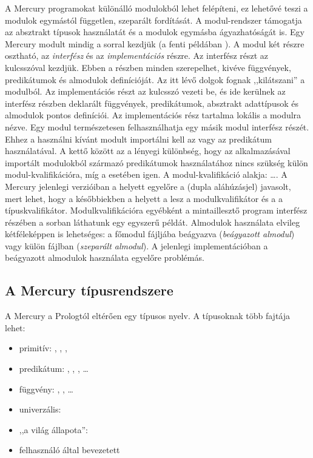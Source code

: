 A Mercury programokat különálló modulokból lehet felépíteni, ez lehetővé teszi a
modulok egymástól független, szeparált fordítását. A modul-rendszer támogatja az
absztrakt típusok használatát és a modulok egymásba ágyazhatóságát is.
\br
Egy Mercury modult mindig a   sorral kezdjük
(a fenti példában ). A modul két részre osztható, az
\emph{interfész} és az \emph{implementációs} részre. Az interfész részt az
 kulcsszóval kezdjük. Ebben a részben minden szerepelhet, kivéve
függvények, predikátumok és almodulok definícióját. Az itt lévő dolgok fognak
,,kilátszani'' a modulból. Az implementációs részt az  kulcsszó
vezeti be, és ide kerülnek az interfész részben deklarált függvények, predikátumok,
absztrakt adattípusok és almodulok pontos definíciói. Az implementációs rész tartalma
lokális a modulra nézve.
\br
Egy modul természetesen felhasználhatja egy másik modul interfész részét. Ehhez
a használni kívánt modult importálni kell az  
vagy az   predikátum használatával. A kettő
között az a lényegi különbség, hogy az  alkalmazásával importált
modulokból származó predikátumok használatához nincs szükség külön modul-kvalifikációra,
míg a  esetében igen. A modul-kvalifikáció alakja:
\cd{:}\cd{:}\dots\cd{:}\cd{:}.
A Mercury jelenlegi verzióiban a \cd{:} helyett egyelőre a \cd{\_\_} (dupla aláhúzásjel)
javasolt, mert lehet, hogy a későbbiekben a \cd{:} helyett a  lesz a
modulkvalifikátor és a \cd{:} a típuskvalifikátor. Modulkvalifikációra egyébként a
mintaillesztő program interfész részében a
 sorban láthatunk egy egyszerű példát.
\br
Almodulok használata elvileg kétféleképpen is lehetséges: a főmodul fájljába beágyazva
(\emph{beágyazott almodul}) vagy külön fájlban (\emph{szeparált almodul}). A jelenlegi
implementációban a beágyazott almodulok használata egyelőre problémás.

\subsection{A Mercury típusrendszere}

A Mercury a Prologtól eltérően egy típusos nyelv. A típusoknak több fajtája lehet:

\begin{itemize}
\item primitív: , , , 
\item predikátum: , , , \dots
\item függvény: , , \dots
\item univerzális: 
\item ,,a világ állapota'': 
\item felhasználó által bevezetett
\end{itemize}

